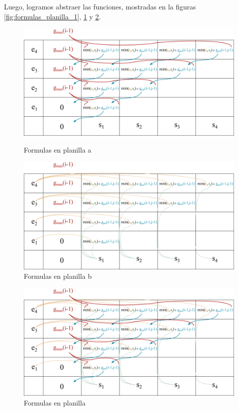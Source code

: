 Luego, logramos abstraer las funciones, mostradas en la figuras \ref{fig:formulas_planilla_1},
\ref{fig:formulas_planilla_2} y \ref{fig:planilla_completa}.

\begin{figure}[ht]
    \centering
    \begin{minipage}[b]{0.495\textwidth}
        \centering
        \includegraphics[width=\textwidth]{img/formulas_planilla_1.png}
        \caption{Formulas en planilla a}
        \label{fig:formulas_planilla_1}
    \end{minipage}
    \begin{minipage}[b]{0.495\textwidth}
        \centering
        \includegraphics[width=\textwidth]{img/formulas_planilla_2.png}
        \caption{Formulas en planilla b}
        \label{fig:formulas_planilla_2}
    \end{minipage}
\end{figure}

\begin{figure}[H]
    \centering
    \includegraphics[width=1\textwidth]{img/planilla_completa.png}
    \caption{Formulas en planilla}
    \label{fig:planilla_completa}
\end{figure}

